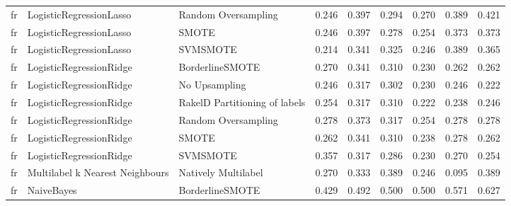 \begin{tabular}{lllllllll}
      fr &         LogisticRegressionLasso &           Random Oversampling & 0.246 &                     0.397 &                 0.294 &                  0.270 &                                   0.389 &     0.421 \\
      fr &         LogisticRegressionLasso &                         SMOTE & 0.246 &                     0.397 &                 0.278 &                  0.254 &                                   0.373 &     0.373 \\
      fr &         LogisticRegressionLasso &                      SVMSMOTE & 0.214 &                     0.341 &                 0.325 &                  0.246 &                                   0.389 &     0.365 \\
      fr &         LogisticRegressionRidge &               BorderlineSMOTE & 0.270 &                     0.341 &                 0.310 &                  0.230 &                                   0.262 &     0.262 \\
      fr &         LogisticRegressionRidge &                 No Upsampling & 0.246 &                     0.317 &                 0.302 &                  0.230 &                                   0.246 &     0.222 \\
      fr &         LogisticRegressionRidge & RakelD Partitioning of labels & 0.254 &                     0.317 &                 0.310 &                  0.222 &                                   0.238 &     0.246 \\
      fr &         LogisticRegressionRidge &           Random Oversampling & 0.278 &                     0.373 &                 0.317 &                  0.254 &                                   0.278 &     0.278 \\
      fr &         LogisticRegressionRidge &                         SMOTE & 0.262 &                     0.341 &                 0.310 &                  0.238 &                                   0.278 &     0.262 \\
      fr &         LogisticRegressionRidge &                      SVMSMOTE & 0.357 &                     0.317 &                 0.286 &                  0.230 &                                   0.270 &     0.254 \\
      fr & Multilabel k Nearest Neighbours &           Natively Multilabel & 0.270 &                     0.333 &                 0.389 &                  0.246 &                                   0.095 &     0.389 \\
      fr &                      NaiveBayes &               BorderlineSMOTE & 0.429 &                     0.492 &                 0.500 &                  0.500 &                                   0.571 &     0.627 \\

\end{tabular}
